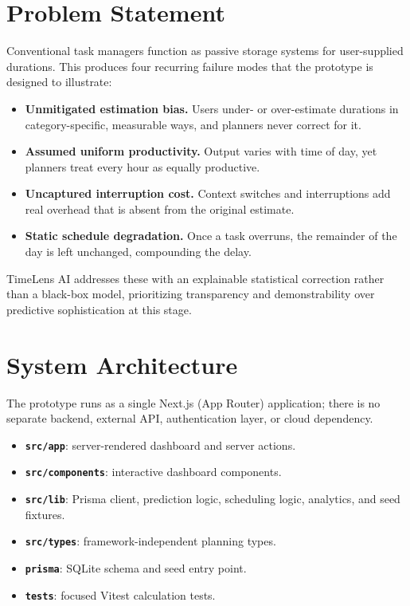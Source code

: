 \documentclass[11pt,a4paper]{article}
\begin{document}
\section{Problem Statement}
Conventional task managers function as passive storage systems for user-supplied durations. This
produces four recurring failure modes that the prototype is designed to illustrate:
\begin{itemize}
    \item \textbf{Unmitigated estimation bias.} Users under- or over-estimate durations in
    category-specific, measurable ways, and planners never correct for it.
    \item \textbf{Assumed uniform productivity.} Output varies with time of day, yet planners treat
    every hour as equally productive.
    \item \textbf{Uncaptured interruption cost.} Context switches and interruptions add real overhead
    that is absent from the original estimate.
    \item \textbf{Static schedule degradation.} Once a task overruns, the remainder of the day is left
    unchanged, compounding the delay.
\end{itemize}
TimeLens AI addresses these with an explainable statistical correction rather than a black-box model,
prioritizing transparency and demonstrability over predictive sophistication at this stage.

\section{System Architecture}
The prototype runs as a single Next.js (App Router) application; there is no separate backend, external
API, authentication layer, or cloud dependency.

\begin{itemize}
    \item \textbf{\texttt{src/app}}: server-rendered dashboard and server actions.
    \item \textbf{\texttt{src/components}}: interactive dashboard components.
    \item \textbf{\texttt{src/lib}}: Prisma client, prediction logic, scheduling logic, analytics,
    and seed fixtures.
    \item \textbf{\texttt{src/types}}: framework-independent planning types.
    \item \textbf{\texttt{prisma}}: SQLite schema and seed entry point.
    \item \textbf{\texttt{tests}}: focused Vitest calculation tests.
\end{itemize}
\end{document}
